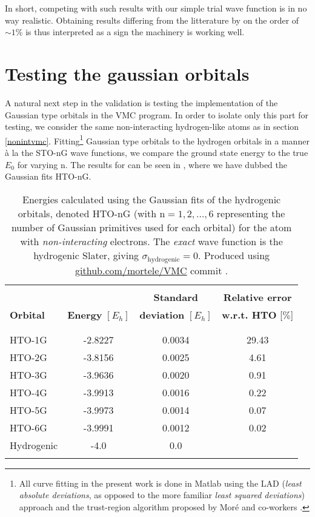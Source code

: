 \documentclass[../../master.tex]{subfiles}
\begin{document}
In short, competing with such results with our simple trial wave function is in no way realistic. Obtaining results differing from the litterature by on the order of $\sim 1\%$ is thus interpreted as a sign the machinery is working well. 


\section{Testing the gaussian orbitals}
A natural next step in the validation is testing the implementation of the Gaussian type orbitals in the VMC program. In order to isolate only this part for testing, we consider the same non-interacting hydrogen-like atoms as in section \ref{nonintvmc}. Fitting\footnote{All curve fitting in the present work is done in {\sc Matlab} using the LAD (\emph{least absolute deviations}, as opposed to the more familiar \emph{least squared deviations}) approach and the trust-region algorithm proposed by Moré and co-workers \cite{charnes1955optimal,koenker1978regression,more1983computing}.} Gaussian type orbitals to the hydrogen orbitals in a manner à la the STO-nG wave functions, we compare the ground state energy to the true $E_0$ for varying n. The results for  can be seen in , where we have dubbed the Gaussian fits HTO-nG.

\begin{table}
\centering{}
\setlength\extrarowheight{2pt}
\begin{tabularx}{\textwidth}{X *{3}{S[table-format=-1.3,table-space-text-post=***]}}
\hline
\hline
\\[-0.9em]
                 &                          & \phantom{-}\textbf{Standard}          & \textbf{Relative error}    \\
\textbf{Orbital} & \textbf{Energy} $[E_h]$  & \textbf{deviation} $[E_h]$ & \textbf{w.r.t. HTO} [$\%$]  \\
\\[-0.9em]
\hline
\\[-0.9em]
HTO-1G & -2.8227  & 0.0034  &   29.43 \\
HTO-2G & -3.8156  & 0.0025  &    4.61 \\
HTO-3G & -3.9636  & 0.0020  &    0.91 \\
HTO-4G & -3.9913  & 0.0016  &    0.22 \\
HTO-5G & -3.9973  & 0.0014  &    0.07 \\
HTO-6G & -3.9991  & 0.0012  &    0.02 \\
Hydrogenic    & -4.0    & 0.0 & \\
\\[-0.9em]
\hline
\end{tabularx}
\caption{Energies calculated using the Gaussian fits of the hydrogenic orbitals, denoted HTO-nG (with $\text{n}=1,2,\dots,6$ representing the number of Gaussian primitives used for each orbital) for the  atom with \emph{non-interacting} electrons. The \emph{exact} wave function is the hydrogenic Slater, giving $\sigma_\text{hydrogenic}=0$. Produced using \url{github.com/mortele/VMC} commit . \label{tab:vmcgaussnonint}}
\end{table}
\end{document}
